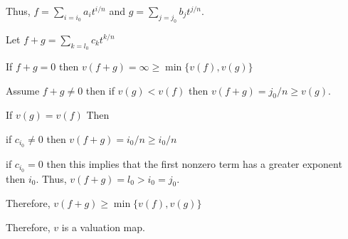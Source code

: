 \documentclass[12pt, letterpaper]{article}
\begin{document}
\begin{problemproof}
    Thus, $f=\sum_{i=i_0}a_it^{i/n}$ and $g=\sum_{j=j_0}b_jt^{j/n}$.

    Let $f+g=\sum_{k=l_0} c_k t^{k/n}$

    If $f+g = 0$ then $v(f+g)= \infty \geq \min\{v(f),v(g)\}$

    Assume $f+g \neq 0$ then if $v(g) < v(f)$ then $v(f+g)=j_0/n  \geq v(g)$.

    If $v(g)=v(f)$ Then

    if $c_{i_0} \neq 0$ then $v(f+g)= i_0/n \geq i_0/n$

    if $c_{i_0} = 0$ then this implies that the first nonzero term has a greater exponent then $i_0$. Thus, $v(f+g)=l_0 > i_0=j_0$.

    Therefore, $v(f+g) \geq \min \{v(f),v(g)\}$

    Therefore, $v$ is a valuation map.
\end{problemproof}
\end{document}
